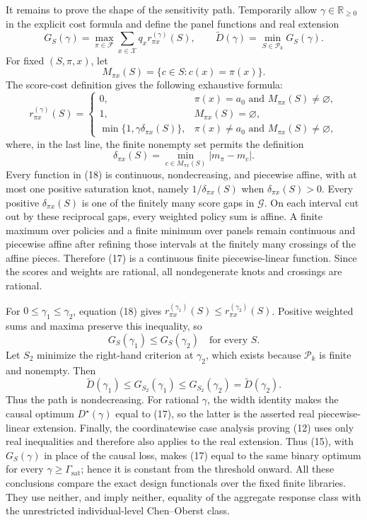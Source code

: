 It remains to prove the shape of the sensitivity path.  Temporarily allow
\(\gamma\in\mathbb R_{\geq0}\) in the explicit cost formula and define
the panel functions and real extension
\[
G_S(\gamma)=\max_{\pi\in\mathcal F}
\sum_{x\in\mathcal X}q_x r^{(\gamma)}_{\pi x}(S),
\qquad
\widetilde D(\gamma)=\min_{S\in\mathcal P_k}G_S(\gamma).            \tag{17}
\]
For fixed \((S,\pi,x)\), let
\[
M_{\pi x}(S)=\{c\in S:c(x)=\pi(x)\}.
\]
The score-cost definition gives the following exhaustive formula:
\[
r^{(\gamma)}_{\pi x}(S)=
\begin{cases}
0,&\pi(x)=a_0\text{ and }M_{\pi x}(S)\neq\varnothing,\\
1,&M_{\pi x}(S)=\varnothing,\\
\min\{1,\gamma\delta_{\pi x}(S)\},
&\pi(x)\neq a_0\text{ and }M_{\pi x}(S)\neq\varnothing,
\end{cases}                                                         \tag{18}
\]
where, in the last line, the finite nonempty set permits the definition
\[
\delta_{\pi x}(S)=\min_{c\in M_{\pi x}(S)}|m_\pi-m_c|.
\]
Every function in (18) is continuous, nondecreasing, and piecewise affine,
with at most one positive saturation knot, namely
\(1/\delta_{\pi x}(S)\) when \(\delta_{\pi x}(S)>0\).  Every positive
\(\delta_{\pi x}(S)\) is one of the finitely many score gaps in
\(\mathcal G\).  On each interval cut out by these reciprocal gaps, every
weighted policy sum is affine.  A finite maximum over policies and a finite
minimum over panels remain continuous and piecewise affine after refining
those intervals at the finitely many crossings of the affine pieces.
Therefore (17) is a continuous finite piecewise-linear function.  Since
the scores and weights are rational, all nondegenerate knots and crossings
are rational.

For \(0\leq\gamma_1\leq\gamma_2\), equation (18) gives
\(r^{(\gamma_1)}_{\pi x}(S)\leq
r^{(\gamma_2)}_{\pi x}(S)\).  Positive weighted sums and maxima preserve
this inequality, so
\[
G_S(\gamma_1)\leq G_S(\gamma_2)
\quad\text{for every }S.                                            \tag{19}
\]
Let \(S_2\) minimize the right-hand criterion at \(\gamma_2\), which
exists because \(\mathcal P_k\) is finite and nonempty.  Then
\[
\widetilde D(\gamma_1)
\leq G_{S_2}(\gamma_1)
\leq G_{S_2}(\gamma_2)
=\widetilde D(\gamma_2).                                            \tag{20}
\]
Thus the path is nondecreasing.  For rational \(\gamma\), the width
identity makes the causal optimum \(D^\star(\gamma)\) equal to (17), so
the latter is the asserted real piecewise-linear extension.  Finally, the
coordinatewise case analysis proving (12) uses only real inequalities and
therefore also applies to the real extension.  Thus (15), with
\(G_S(\gamma)\) in place of the causal loss, makes (17) equal to the same
binary optimum for every \(\gamma\geq\Gamma_{\mathrm{sat}}\); hence it is
constant from the threshold onward.  All these conclusions compare the exact design
functionals over the fixed finite libraries.  They use neither, and imply
neither, equality of the aggregate response class with the unrestricted
individual-level Chen--Oberst class.
